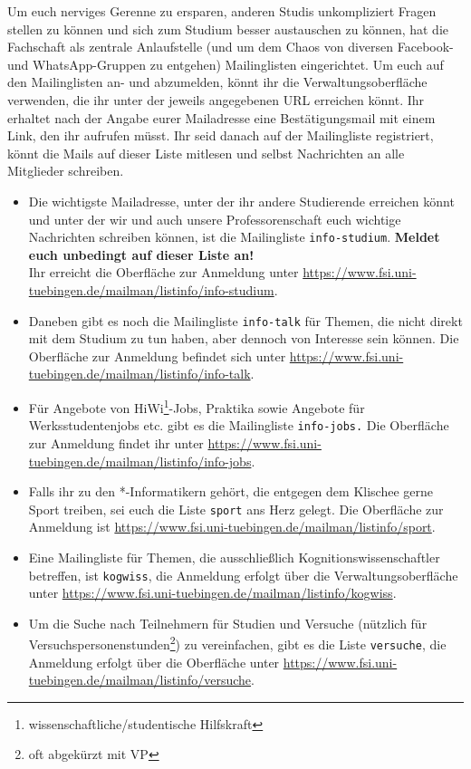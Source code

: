Um euch nerviges Gerenne zu ersparen, anderen Studis unkompliziert Fragen stellen zu können und
sich zum Studium besser austauschen zu können, hat die Fachschaft als zentrale Anlaufstelle (und um dem Chaos von diversen Facebook- und WhatsApp-Gruppen zu entgehen) Mailinglisten eingerichtet. 
Um euch auf den Mailinglisten an- und abzumelden, könnt ihr die Verwaltungsoberfläche verwenden, die ihr unter der jeweils angegebenen URL erreichen könnt. Ihr erhaltet nach der Angabe eurer Mailadresse eine Bestätigungsmail mit einem Link, den ihr aufrufen müsst. Ihr seid danach auf der Mailingliste registriert, könnt die Mails auf dieser Liste mitlesen und selbst Nachrichten an alle Mitglieder schreiben.
\begin{itemize}
\item Die wichtigste Mailadresse, unter der ihr andere Studierende erreichen könnt und unter der wir und auch unsere Professorenschaft euch wichtige Nachrichten schreiben können, ist die Mailingliste \texttt{info-studium}. \textbf{Meldet euch unbedingt auf dieser Liste an!}\\
Ihr erreicht die Oberfläche zur Anmeldung unter \url{https://www.fsi.uni-tuebingen.de/mailman/listinfo/info-studium}.
\item Daneben gibt es noch die Mailingliste \texttt{info-talk} für Themen, die nicht direkt mit dem Studium
zu tun haben, aber dennoch von Interesse sein können. Die Oberfläche zur Anmeldung befindet sich unter \url{https://www.fsi.uni-tuebingen.de/mailman/listinfo/info-talk}.
\item Für Angebote von HiWi\footnote{wissenschaftliche/studentische Hilfskraft}-Jobs, Praktika sowie Angebote für Werksstudentenjobs etc. gibt es die Mailingliste \texttt{info-jobs.} Die Oberfläche zur Anmeldung findet ihr unter \url{https://www.fsi.uni-tuebingen.de/mailman/listinfo/info-jobs}.
\item Falls ihr zu den *-Informatikern gehört, die entgegen dem Klischee gerne Sport treiben, sei euch die Liste \texttt{sport} ans Herz gelegt. Die Oberfläche zur Anmeldung ist \url{https://www.fsi.uni-tuebingen.de/mailman/listinfo/sport}. 
\ifkogwiss 
\item Eine Mailingliste für Themen, die ausschließlich Kognitionswissenschaftler betreffen, ist
\texttt{kogwiss}, die Anmeldung erfolgt über die Verwaltungsoberfläche unter \url{https://www.fsi.uni-tuebingen.de/mailman/listinfo/kogwiss}.
\item Um die Suche nach Teilnehmern für Studien und Versuche (nützlich für Versuchspersonenstunden\footnote{oft abgekürzt mit VP}) zu vereinfachen, gibt es die Liste \texttt{versuche}, 
die Anmeldung erfolgt über die Oberfläche unter \url{https://www.fsi.uni-tuebingen.de/mailman/listinfo/versuche}. 
\fi
\end{itemize}
